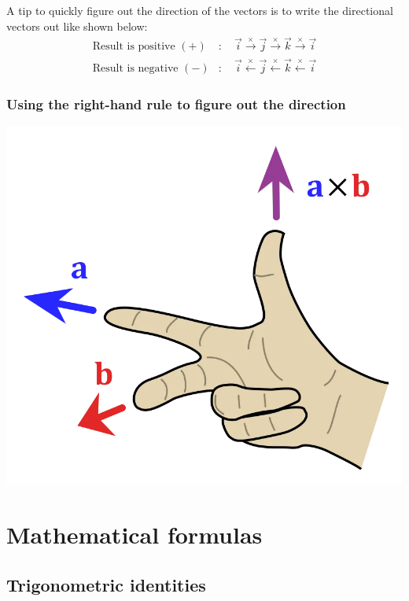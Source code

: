 \documentclass[11pt]{article}
\begin{document}
A tip to quickly figure out the direction of the vectors is to write the directional vectors out like shown below:
\begin{align*}
\text{Result is positive } (+) &: \quad \vec{i} \xrightarrow{\times} \vec{j} \xrightarrow{\times} \vec{k} \xrightarrow{\times} \vec{i} \\
\text{Result is negative } (-) &: \quad \vec{i} \xleftarrow{\times} \vec{j} \xleftarrow{\times} \vec{k} \xleftarrow{\times} \vec{i}
\end{align*}

\subsubsection{Using the right-hand rule to figure out the direction}
\label{sec:org8cb4b1f}
\begin{center}
\includegraphics[width=.9\linewidth]{./images/right-hand-rule-cross-product.png}
\end{center}

 \newpage

\section{Mathematical formulas}
\label{sec:org3273cd0}

\subsection{Trigonometric identities}
\label{sec:orge5d1097}
\end{document}

